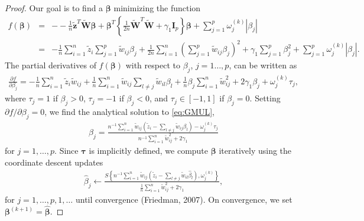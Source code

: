 \documentclass[a4paper,12pt,openany]{report}
\theoremstyle{plain}
\theoremstyle{plain}
\theoremstyle{plain}
\theoremstyle{plain}
\theoremstyle{plain}
\theoremstyle{plain}
\theoremstyle{plain}
\theoremstyle{plain}
\theoremstyle{plain}
\theoremstyle{plain}
\theoremstyle{plain}
\theoremstyle{plain}
\begin{document}
\begin{proof}
	 Our goal is to find a $\boldsymbol{\beta}$ minimizing the function
	\begin{align*}
	f\left(\boldsymbol{\beta} \right) &=&
	--\frac{1}{n}\tilde{\mathbf{z}}^{T} \tilde{\mathbf{W}}\boldsymbol{\beta} + \boldsymbol{\beta}^{T}\left\{ \frac{1}{2n}  \tilde{\mathbf{W}}^{T} \tilde{\mathbf{W}} + \gamma_{1} \mathbf{I}_{p} \right\}\boldsymbol{\beta}  + \sum_{j=1}^{p} \omega_{j}^{(k)} \left|\beta_{j} \right|\\
	 &=&
	-\frac{1}{n} \sum_{i=1}^{n} \tilde{z}_{i} \sum_{j=1}^{p} \tilde{w}_{ij} \beta_{j} + \frac{1}{2n} \sum_{i=1}^{n} \left( \sum_{j=1}^{p} \tilde{w}_{ij} \beta_{j}\right)^{2}  + \gamma_{1} \sum_{j=1}^{p} \beta_{j}^{2} +  \sum_{j=1}^{p} \omega_{j}^{(k)} \left|\beta_{j} \right|.
	\end{align*}
	The partial derivatives of $f\left(\boldsymbol{\beta}\right)$ with respect to  $\beta_{j}$, $j=1\dots,p$, can be written as
	\begin{align*}
	\frac{\partial f}{\partial \beta_{j}} = 
	-\frac{1}{n} \sum_{i=1}^{n} \tilde{z}_{i} \tilde{w}_{ij} + \frac{1}{n} \sum_{i=1}^{n} \tilde{w}_{ij} \sum_{l\neq j} \tilde{w}_{il}\beta_{l}  +\frac{1}{n} \beta_{j} \sum_{i=1}^{n} \tilde{w}_{ij}^{2} +2\gamma_{1} \beta_{j} + \omega_{j}^{(k)} \tau_{j},
	\end{align*}
	where $\tau_{j} = 1$ if $\beta_{j} > 0$, $\tau_{j} = -1$ if $\beta_{j} < 0$, and $\tau_{j} \in [-1,1]$ if $\beta_{j} = 0$. Setting $\partial f / \partial \beta_{j} = 0$, we find the analytical solution to \eqref{eq:GMUL},
	\begin{align*}
	\beta_{j} = \frac{n^{-1} \sum_{i=1}^{n}\tilde{w}_{ij} \left(\tilde{z}_{i}   - \sum_{l \neq j} \tilde{w}_{ij} \beta_{l} \right) - \omega_{j}^{\left(k\right)} \tau_{j}}{ n^{-1} \sum_{i=1}^{n} \tilde{w}_{ij}^{2} + 2\gamma_{1}}
	\end{align*}
	for $j=1,\dots,p$. Since $\boldsymbol{\tau}$ is implicitly defined, we compute $\boldsymbol{\beta}$ iteratively using the coordinate descent updates
	\begin{align*}
	\hat{\beta}_{j} \leftarrow \frac{S\left\{n^{-1}\sum_{i=1}^{n} \tilde{w}_{ij} \left(\tilde{z}_{i} - \sum_{l \neq j} \tilde{w}_{il} \hat{\beta}_{l} \right), \omega_{j}^{(k)}\right\}}{\frac{1}{n} \sum_{i=1}^{n} \tilde{w}_{ij}^{2} + 2 \gamma_{1}}, 
	\end{align*}
	for $j=1,\dots,p,1,\dots$ until convergence (Friedman, 2007). On convergence, we set $\boldsymbol{\beta}^{(k+1)} = \hat{\boldsymbol{\beta}}$. 
\end{proof}
\end{document}

